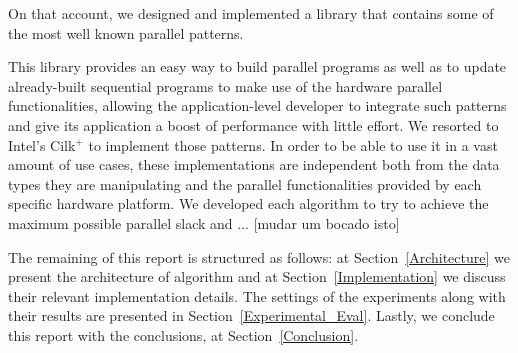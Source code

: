 \documentclass[conference,compsoc]{IEEEtran}
\begin{document}
On that account, we designed and implemented a library that contains some of the most well known parallel patterns.

This library provides an easy way to build parallel programs as well as to update already-built sequential programs to make use of the hardware parallel functionalities, allowing the application-level developer to integrate such patterns and give its application a boost of performance with little effort. We resorted to Intel's Cilk$^+$ \cite{robison2012cilk} to implement those patterns. In order to be able to use it in a vast amount of use cases, these implementations are independent both from the data types they are manipulating and the parallel functionalities provided by each specific hardware platform. We developed each algorithm to try to achieve the maximum possible parallel slack and ... [mudar um bocado isto]

The remaining of this report is structured as follows: at Section~\ref{Architecture} we present the architecture of algorithm and at Section~\ref{Implementation} we discuss their relevant implementation details. The settings of the experiments along with their results are presented in Section~\ref{Experimental_Eval}. Lastly, we conclude this report with the conclusions, at Section~\ref{Conclusion}.

\end{document}

